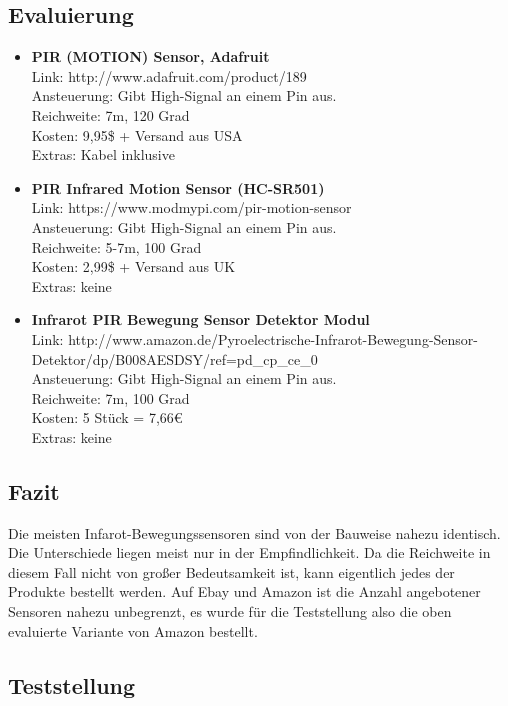 \documentclass[12pt,a4paper]{scrreprt}
\begin{document}
\subsection{Evaluierung}
\begin{itemize}
\item \textbf{PIR (MOTION) Sensor, Adafruit}\\
Link: http://www.adafruit.com/product/189\\
Ansteuerung: Gibt High-Signal an einem Pin aus.\\
Reichweite: 7m, 120 Grad\\
Kosten: 9,95\$ + Versand aus USA\\
Extras: Kabel inklusive\\
\item \textbf{PIR Infrared Motion Sensor (HC-SR501)}\\
Link: https://www.modmypi.com/pir-motion-sensor\\
Ansteuerung: Gibt High-Signal an einem Pin aus.\\
Reichweite: 5-7m, 100 Grad\\
Kosten: 2,99\$ + Versand aus UK\\
Extras: keine\\
\item \textbf{Infrarot PIR Bewegung Sensor Detektor Modul}\\
Link: http://www.amazon.de/Pyroelectrische-Infrarot-Bewegung-Sensor-Detektor/dp/B008AESDSY/ref=pd\_cp\_ce\_0\\
Ansteuerung: Gibt High-Signal an einem Pin aus.\\
Reichweite: 7m, 100 Grad\\
Kosten: 5 Stück = 7,66€\\
Extras: keine\\
\end{itemize}

\subsection{Fazit}
Die meisten Infarot-Bewegungssensoren sind von der Bauweise nahezu identisch. Die Unterschiede liegen meist nur in der Empfindlichkeit. Da die Reichweite in diesem Fall nicht von großer Bedeutsamkeit ist, kann eigentlich jedes der Produkte bestellt werden. Auf Ebay und Amazon ist die Anzahl angebotener Sensoren nahezu unbegrenzt, es wurde für die Teststellung also die oben evaluierte Variante von Amazon bestellt. 
\subsection{Teststellung}
\end{document}
